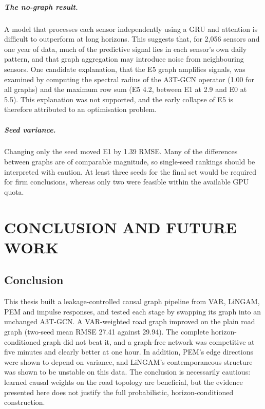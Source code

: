 \documentclass[MTech]{ugthesis}
\begin{document}
\paragraph{The no-graph result.} A model that processes each sensor independently using a GRU and attention is difficult to outperform at long horizons. This suggests that, for 2,056 sensors and one year of data, much of the predictive signal lies in each sensor's own daily pattern, and that graph aggregation may introduce noise from neighbouring sensors. One candidate explanation, that the E5 graph amplifies signals, was examined by computing the spectral radius of the A3T-GCN operator (1.00 for all graphs) and the maximum row sum (E5 4.2, between E1 at 2.9 and E0 at 5.5). This explanation was not supported, and the early collapse of E5 is therefore attributed to an optimisation problem.

\paragraph{Seed variance.} Changing only the seed moved E1 by 1.39 RMSE. Many of the differences between graphs are of comparable magnitude, so single-seed rankings should be interpreted with caution. At least three seeds for the final set would be required for firm conclusions, whereas only two were feasible within the available GPU quota.

\chapter{CONCLUSION AND FUTURE WORK}

\section{Conclusion}
This thesis built a leakage-controlled causal graph pipeline from VAR, LiNGAM, PEM and impulse responses, and tested each stage by swapping its graph into an unchanged A3T-GCN. A VAR-weighted road graph improved on the plain road graph (two-seed mean RMSE 27.41 against 29.94). The complete horizon-conditioned graph did not beat it, and a graph-free network was competitive at five minutes and clearly better at one hour. In addition, PEM's edge directions were shown to depend on variance, and LiNGAM's contemporaneous structure was shown to be unstable on this data. The conclusion is necessarily cautious: learned causal weights on the road topology are beneficial, but the evidence presented here does not justify the full probabilistic, horizon-conditioned construction.
\end{document}
